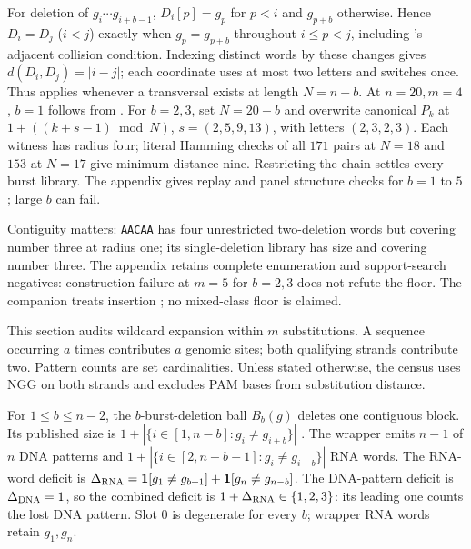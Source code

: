 \begin{proposition}\label{prop:bstructure}
For deletion of $g_i\cdots g_{i+b-1}$, $D_i[p]=g_p$ for $p<i$ and $g_{p+b}$
otherwise. Hence $D_i=D_j$ ($i<j$) exactly when $g_p=g_{p+b}$ throughout
$i\le p<j$, including 's adjacent collision condition.
Indexing distinct words by these changes gives $d(D_i,D_j)=|i-j|$; each coordinate
uses at most two letters and switches once. Thus  applies whenever
a transversal exists at length $N=n-b$. At $n=20,m=4$, $b=1$ follows from
. For $b=2,3$, set $N=20-b$ and overwrite canonical $P_k$ at
$1+((k+s-1)\bmod N)$, $s=(2,5,9,13)$, with letters $(2,3,2,3)$.
Each witness has radius four; literal Hamming checks of all $171$ pairs at
$N=18$ and $153$ at $N=17$ give minimum distance nine. Restricting the chain
settles every burst library. The appendix gives replay and panel structure
checks for $b=1$ to $5$; large $b$ can fail.
\end{proposition}

Contiguity matters: \texttt{AACAA} has four unrestricted two-deletion words but
covering number three at radius one; its single-deletion library has size and covering
number three. The appendix retains complete enumeration and support-search negatives:
construction failure at $m=5$ for $b=2,3$ does not refute the floor. The companion
treats insertion \citep{companion_reach}; no mixed-class floor is claimed.

\label{sec:reduction}
This section audits wildcard expansion within $m$ substitutions. A sequence occurring
$a$ times contributes $a$ genomic sites; both qualifying strands contribute two.
Pattern counts are set cardinalities. Unless stated otherwise, the census uses
NGG on both strands and excludes PAM bases from substitution distance.

\begin{proposition}\label{prop:deficit}
For $1\le b\le n-2$, the $b$-burst-deletion ball $B_b(g)$ deletes one contiguous
block. Its published size is $1+|\{i\in[1,n-b]:g_i\ne g_{i+b}\}|$
\citep{lan2026burstballs,schoeny2016burst,levenshtein1967adjacent}.
The wrapper \citep{park2016casoffinderbulge} emits $n-1$ of $n$ DNA patterns and
$1+|\{i\in[2,n-b-1]:g_i\ne g_{i+b}\}|$ RNA words. The RNA-word deficit is
$\Delta_{\rm RNA}=\mathbf{1}[g_1\ne g_{b+1}]+\mathbf{1}[g_n\ne g_{n-b}]$.
The DNA-pattern deficit is $\Delta_{\rm DNA}=1$, so the combined deficit is
$1+\Delta_{\rm RNA}\in\{1,2,3\}$: its leading one counts the lost DNA pattern.
Slot $0$ is degenerate for every $b$; wrapper RNA words retain $g_1,g_n$.
\end{proposition}

